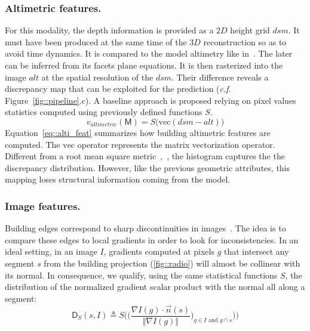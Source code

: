 \documentclass[runningheads]{llncs}
\begin{document}
\subsubsection{Altimetric features.}
For this modality, the depth information is provided as a $2D$ height grid $dsm$. It must have been produced at the same time of the $3D$ reconstruction so as to avoid time dynamics. It is compared to the model altimetry like in~\cite{Bredif2007}. The later can be inferred from its facets plane equations. It is then rasterized into the image $alt$ at the spatial resolution of the $dsm$. Their difference reveals a discrepancy map that can be exploited for the prediction (\textit{c.f.} Figure~\ref{fig::pipeline}.c). A baseline approach is proposed relying on pixel values statistics computed using previously defined functions $S$.
\begin{equation}
	\label{eq::alti_feat}
    v_{altimetric}(\mathsf{M}) = S\big( \mathrm{vec}(dsm - alt) \big)
\end{equation}
Equation~\ref{eq::alti_feat} summarizes how building altimetric features are computed. The $\mathrm{vec}$ operator represents the matrix vectorization operator. Different from a root mean square metric~\cite{lafarge2012creating},~\cite{Poullis2013}, the histogram captures the the discrepancy distribution. However, like the previous geometric attributes, this mapping loses structural information coming from the model.

\subsubsection{Image features.}
Building edges correspond to sharp discontinuities in images~\cite{canny1986computational}. The idea is to compare these edges to local gradients in order to look for inconsistencies. In an ideal setting, in an image $I$, gradients computed at pixels $g$ that intersect any segment $s$ from the building projection (\ref{fig::radio}) will almost be collinear with its normal. In consequence, we qualify, using the same statistical functions $S$, the distribution of the normalized gradient scalar product with the normal all along a segment:
\begin{equation}
	\label{eq::corr_seg}
    \mathsf{D}_S(s, I) \triangleq S \bigg( \Big(\frac{\nabla I(g) \cdot \vec{n}(s)}{\Vert \nabla I(g)\Vert})_{g \in I \textrm{ and } g \cap s} \Big)\bigg)
\end{equation}
\end{document}

